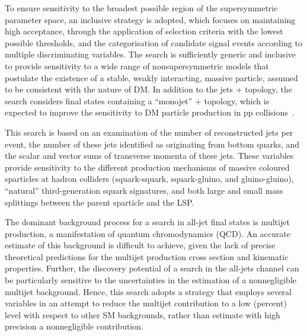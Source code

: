 To ensure sensitivity to the broadest possible region of the
supersymmetric parameter space, an inclusive strategy is adopted,
which focuses on maintaining high acceptance, through the application
of selection criteria with the lowest possible thresholds, and the
categorisation of candidate signal events according to multiple
discriminating variables. 
The search is sufficiently generic and inclusive to provide
sensitivity to a wide range of nonsupersymmetric models that postulate
the existence of a stable, weakly interacting, massive particle,
assumed to be consistent with the nature of DM. In addition to the
jets + \ptvecmiss topology, the search considers final states
containing a ``monojet'' + \ptvecmiss topology, which is expected to
improve the sensitivity to DM particle production in pp
collisions~\cite{Fox:2012ee, Buchmueller:2015eea}.

This search is based on an examination of the number of reconstructed
jets per event, the number of these jets identified as originating
from bottom quarks, and the scalar and vector sums of transverse
momenta of these jets. These variables provide sensitivity to the
different production mechanisms of massive coloured sparticles at
hadron colliders (\ie squark-squark, squark-gluino, and
gluino-gluino), ``natural'' third-generation squark signatures, and
both large and small mass splittings between the parent sparticle and
the LSP.

The dominant background process for a search in all-jet final states
is multijet production, a manifestation of quantum chromodynamics
(QCD). An accurate estimate of this background is difficult to
achieve, given the lack of precise theoretical predictions for the
multijet production cross section and kinematic properties. Further,
the discovery potential of a search in the all-jets channel can be
particularly sensitive to the uncertainties in the estimation of a
nonnegligible multijet background. Hence, this search adopts a
strategy that employs several variables in an attempt to reduce the
multijet contribution to a low (percent) level with respect to other
SM backgrounds, rather than estimate with high precision a
nonnegligible contribution.

